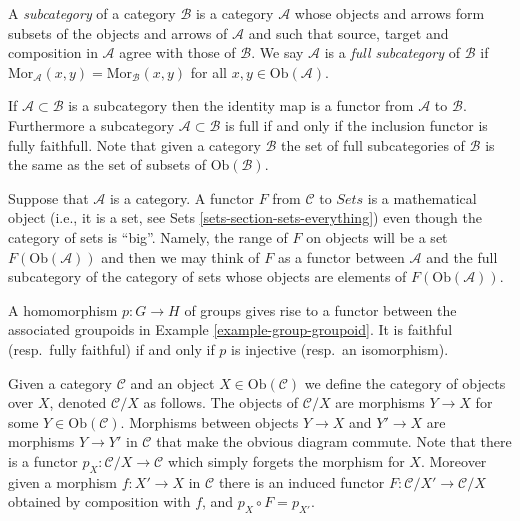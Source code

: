 \begin{definition}
\label{definition-subcategory}
A {\it subcategory} of a category $\mathcal{B}$ is
a category $\mathcal{A}$ whose objects and arrows
form subsets of the objects and arrows
of $\mathcal{A}$ and such that source, target
and composition in $\mathcal{A}$ agree with those
of $\mathcal{B}$. We say $\mathcal{A}$ is a
{\it full subcategory} of $\mathcal{B}$ if $\text{Mor}_{\mathcal{A}}(x,y)
= \text{Mor}_{\mathcal{B}}(x,y)$ for all $x,y \in \text{Ob}(\mathcal{A})$.
\end{definition}

\noindent
If $\mathcal{A} \subset \mathcal{B}$ is a subcategory then the
identity map is a functor from $\mathcal{A}$ to $\mathcal{B}$.
Furthermore a subcategory $\mathcal{A} \subset \mathcal{B}$
is full if and only if the inclusion functor is fully faithfull.
Note that given a category $\mathcal{B}$ the set of full subcategories
of $\mathcal{B}$ is the same as the set of subsets of
$\text{Ob}(\mathcal{B})$.

\begin{remark} 
\label{remark-functor-into-sets}
Suppose that $\mathcal{A}$ is a category.
A functor $F$ from $\mathcal{C}$ to $\textit{Sets}$
is a mathematical object (i.e., it is a set, see
Sets \autoref{sets-section-sets-everything})
even though the category of sets is ``big''.
Namely, the range of $F$ on objects will be 
a set $F(\text{Ob}(\mathcal{A}))$ and then we 
may think of $F$ as a functor between 
$\mathcal{A}$ and the full subcategory
of the category of sets whose
objects are elements of $F(\text{Ob}(\mathcal{A}))$.
\end{remark}

\begin{example}
\label{example-group-homorphism-functor}
A homomorphism $p\colon G\to H$ of groups gives rise to a functor
between the associated groupoids in Example \ref{example-group-groupoid}. It is
faithful (resp.\ fully faithful) if and only if $p$ is injective (resp.\ an
isomorphism).
\end{example}

\begin{example}
\label{example-comma-category}
Given a category $\mathcal{C}$ and an object $X\in \text{Ob}(\mathcal{C})$
we define the category of objects over $X$, denoted $\mathcal{C}/X$ as follows.
The objects of $\mathcal{C}/X$ are morphisms $Y\to X$ for
some $Y\in \text{Ob}(\mathcal{C})$. Morphisms between objects
$Y\to X$ and $Y'\to X$ are morphisms $Y\to Y'$ in $\mathcal{C}$ that
make the obvious diagram commute.  Note that there is a functor
$p_X\colon \mathcal{C}/X\to \mathcal{C}$ which simply forgets the
morphism for $X$.  Moreover given a morphism $f\colon X'\to X$ in
$\mathcal{C}$ there is an induced functor 
$F\colon \mathcal{C}/X' \to \mathcal{C}/X$ obtained by composition with $f$,
and $p_X\circ F = p_{X'}$.
\end{example}

